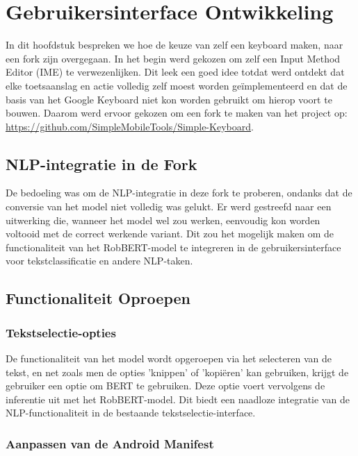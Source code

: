 \chapter{Gebruikersinterface Ontwikkeling}
\label{ch:gebruikersinterface-ontwikkeling}

In dit hoofdstuk bespreken we hoe de keuze van zelf een keyboard maken, naar een fork zijn overgegaan. In het begin werd gekozen om zelf een Input Method Editor (IME) te verwezenlijken. Dit leek een goed idee totdat werd ontdekt dat elke toetsaanslag en actie volledig zelf moest worden geïmplementeerd en dat de basis van het Google Keyboard niet kon worden gebruikt om hierop voort te bouwen. Daarom werd ervoor gekozen om een fork te maken van het project op: \url{https://github.com/SimpleMobileTools/Simple-Keyboard}.

\section{NLP-integratie in de Fork}

De bedoeling was om de NLP-integratie in deze fork te proberen, ondanks dat de conversie van het model niet volledig was gelukt. Er werd gestreefd naar een uitwerking die, wanneer het model wel zou werken, eenvoudig kon worden voltooid met de correct werkende variant. Dit zou het mogelijk maken om de functionaliteit van het RobBERT-model te integreren in de gebruikersinterface voor tekstclassificatie en andere NLP-taken.

\section{Functionaliteit Oproepen}

\subsection{Tekstselectie-opties}

De functionaliteit van het model wordt opgeroepen via het selecteren van de tekst, en net zoals men de opties 'knippen' of 'kopiëren' kan gebruiken, krijgt de gebruiker een optie om BERT te gebruiken. Deze optie voert vervolgens de inferentie uit met het RobBERT-model. Dit biedt een naadloze integratie van de NLP-functionaliteit in de bestaande tekstselectie-interface.

\subsection{Aanpassen van de Android Manifest}

